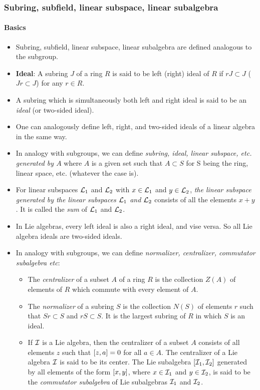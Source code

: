 \subsubsection{Subring, subfield, linear subspace, linear subalgebra}
\paragraph{Basics}
\begin{itemize}
	\item Subring, subfield, linear subspace, linear subalgebra are defined analogous to the subgroup.
	\item \textbf{Ideal}: A subring $J$ of a ring $R$ is said to be left (right) ideal of $R$ if $rJ\subset J$ ($Jr\subset J$) for any $r\in R$. 
	\item A subring which is simultaneously both left and right ideal is said to be an \emph{ideal} (or two-sided ideal).
	\item One can analogously define left, right, and two-sided ideals of a linear algebra in the same way.
	\item In analogy with subgroups, we can define \emph{subring, ideal, linear subspace, etc. generated by $A$} where $A$ is a given set such that $A\subset S$ for S being the ring, linear space, etc. (whatever the case is).
	\item For linear subspaces $\mathcal{L}_1$ and $\mathcal{L}_2$ with $x\in\mathcal{L}_1$ and $y\in\mathcal{L}_2$, \emph{the linear subspace generated by the linear subspaces $\mathcal{L}_1$ and $\mathcal{L}_2$} consists of all the elements $x+y$. It is called the \emph{sum} of $\mathcal{L}_1$ and $\mathcal{L}_2$. 
	\item In Lie algebras, every left ideal is also a right ideal, and vise versa. So all Lie algebra ideals are two-sided ideals.
	\item In analogy with subgroups, we can define \emph{normalizer, centralizer, commutator subalgebra etc}:
	\begin{itemize}
		\item The \emph{centralizer} of a subset $A$ of a ring $R$ is the collection $Z(A)$ of elements of $R$ which commute with every element of $A$.
		\item The \emph{normalizer} of a subring $S$ is the collection $N(S)$ of elements $r$ such that $Sr\subset S$ and $rS\subset S$. It is the largest subring of $R$ in which $S$ is an ideal.
		\item If $\mathcal{I}$ is a Lie algebra, then the centralizer of a subset $A$ consists of all elements $z$ such that $\comm{z}{a}=0$ for all $a\in A$. The centralizer of a Lie algebra $\mathcal{I}$ is said to be its center. The Lie subalgebra $\comm{\cI_1}{\cI_2}$ generated by all elements of the form $\comm{x}{y}$, where $x\in \mathcal{I}_1$ and $y\in \mathcal{I}_2$, is said to be the \emph{commutator subalgebra} of Lie subalgebras $\mathcal{I}_1$ and $\mathcal{I}_2$.
	\end{itemize}  
\end{itemize}
